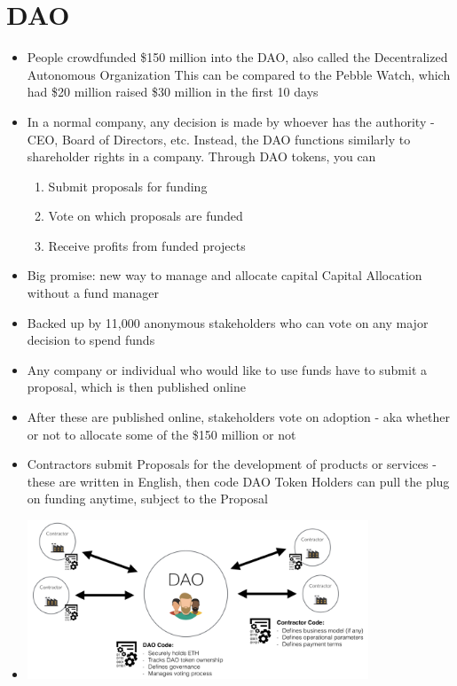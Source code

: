 \documentclass{article}
\begin{document}
\section*{DAO}
\begin{itemize}
  \item People crowdfunded \$150 million into the DAO, also called the Decentralized Autonomous Organization
    \subitem This can be compared to the Pebble Watch, which had \$20 million raised
    \subitem \$30 million in the first 10 days
  \item In a normal company, any decision is made by whoever has the authority - CEO, Board of Directors, etc.
    \subitem Instead, the DAO functions similarly to shareholder rights in a company. Through DAO tokens, you can 
    \begin{enumerate}
      \item Submit proposals for funding
      \item Vote on which proposals are funded
      \item Receive profits from funded projects
    \end{enumerate}
  \item Big promise: new way to manage and allocate capital
    \subitem Capital Allocation without a fund manager
  \item Backed up by 11,000 anonymous stakeholders who can vote on any major decision to spend funds
  \item Any company or individual who would like to use funds have to submit a proposal, which is then published online
  \item After these are published online, stakeholders vote on adoption - aka whether or not to allocate some of the \$150 million
    or not
  \item Contractors submit Proposals for the development of products or services - these are written in English, then code
    \subitem DAO Token Holders can pull the plug on funding anytime, subject to the Proposal
  \item \includegraphics[width=4in]{independence.png}\\

\end{itemize}
\end{document}
